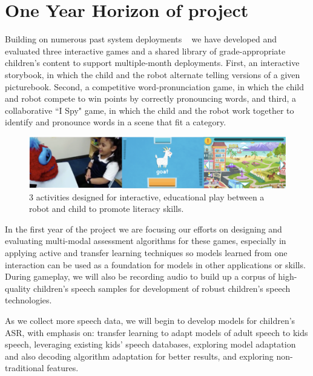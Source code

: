 \section{One Year Horizon of project}
\vspace{-3mm}   
Building on numerous past system deployments ~\cite{park2017hri-bc, gordon2016affective, westlund2017flat} we have developed and evaluated three interactive games and a shared library of grade-appropriate children's content to support multiple-month deployments. First, an interactive storybook, in which the child and the robot alternate telling versions of a given picturebook. Second, a competitive word-pronunciation game, in which the child and robot compete to win points by correctly pronouncing words, and third, a collaborative ``I Spy" game, in which the child and the robot work together to identify and pronounce words in a scene that fit a category.

\begin{figure}%
  \centering
  \includegraphics[width=.85\textwidth]{fig/game_screens.png}  
  \caption{3 activities designed for interactive, educational play between a robot and child to promote literacy skills.}
  \vspace{-4mm} 
  \label{fig:robots}
\end{figure}
In the first year of the project we are focusing our efforts on designing and evaluating multi-modal assessment algorithms for these games, especially in applying active and transfer learning techniques so models learned from one interaction can be used as a foundation for models in other applications or skills. During gameplay, we will also be recording audio to build up a corpus of high-quality children's speech samples for development of robust children's speech technologies.

As we collect more speech data, we will begin to develop models for children's ASR, with emphasis on: transfer learning to adapt models of adult speech to kids speech, leveraging existing kids' speech databases, exploring model adaptation and also decoding algorithm adaptation for better results, and exploring non-traditional features.

\vspace{-4mm}   
